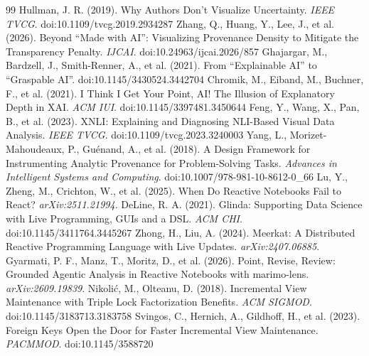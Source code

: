 \documentclass[11pt]{article}
\begin{document}
\begin{thebibliography}{99}
 Hullman, J. R. (2019). Why Authors Don't Visualize Uncertainty. \emph{IEEE TVCG}. doi:10.1109/tvcg.2019.2934287
 Zhang, Q., Huang, Y., Lee, J., et al. (2026). Beyond ``Made with AI'': Visualizing Provenance Density to Mitigate the Transparency Penalty. \emph{IJCAI}. doi:10.24963/ijcai.2026/857
 Ghajargar, M., Bardzell, J., Smith-Renner, A., et al. (2021). From ``Explainable AI'' to ``Graspable AI''. doi:10.1145/3430524.3442704
 Chromik, M., Eiband, M., Buchner, F., et al. (2021). I Think I Get Your Point, AI! The Illusion of Explanatory Depth in XAI. \emph{ACM IUI}. doi:10.1145/3397481.3450644
 Feng, Y., Wang, X., Pan, B., et al. (2023). XNLI: Explaining and Diagnosing NLI-Based Visual Data Analysis. \emph{IEEE TVCG}. doi:10.1109/tvcg.2023.3240003
 Yang, L., Morizet-Mahoudeaux, P., Gu\'enand, A., et al. (2018). A Design Framework for Instrumenting Analytic Provenance for Problem-Solving Tasks. \emph{Advances in Intelligent Systems and Computing}. doi:10.1007/978-981-10-8612-0\_66
 Lu, Y., Zheng, M., Crichton, W., et al. (2025). When Do Reactive Notebooks Fail to React? \emph{arXiv:2511.21994}.
 DeLine, R. A. (2021). Glinda: Supporting Data Science with Live Programming, GUIs and a DSL. \emph{ACM CHI}. doi:10.1145/3411764.3445267
 Zhong, H., Liu, A. (2024). Meerkat: A Distributed Reactive Programming Language with Live Updates. \emph{arXiv:2407.06885}.
 Gyarmati, P. F., Manz, T., Moritz, D., et al. (2026). Point, Revise, Review: Grounded Agentic Analysis in Reactive Notebooks with marimo-lens. \emph{arXiv:2609.19839}.
 Nikoli\'c, M., Olteanu, D. (2018). Incremental View Maintenance with Triple Lock Factorization Benefits. \emph{ACM SIGMOD}. doi:10.1145/3183713.3183758
 Svingos, C., Hernich, A., Gildhoff, H., et al. (2023). Foreign Keys Open the Door for Faster Incremental View Maintenance. \emph{PACMMOD}. doi:10.1145/3588720
\end{thebibliography}
\end{document}
